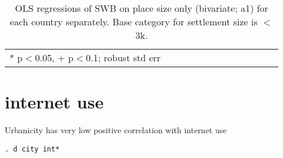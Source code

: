 \documentclass[11pt, letterpaper]{article}
\begin{document}
\begin{spacing}{1.9}
\begin{spacing}{.9} \begin{table}[H]\centering   \begin{scriptsize} \begin{tabular}{p{.5in}p{.5in}p{.5in}p{.5in}p{.5in}p{.5in}p{.5in}p{.5in}p{.5in}p{.5in}p{.5
                                                                      in}p{.5in}p{.5
                                                                      in}}\hline
                                                                      
                                                                      \hline *
                                                                      p$<$0.05,
                                                                      $+$
                                                                      p$<$0.1;
                                                                      robust std
                                                                      err \end{tabular}\end{scriptsize}\caption{\label{d1}OLS
                                                                    regressions
                                                                    of SWB on
                                                                    place size
                                                                    only
                                                                    (bivariate; a1)
                                                                    for each
                                                                    country
                                                                    separately. Base category for settlement size is $<$3k.
                                                                  }\end{table} \end{spacing}


\section{internet use}

Urbanicity has very low positive correlation with internet use

\begin{spacing}{.5}
\begin{scriptsize}
\begin{verbatim}
. d city int*


\end{verbatim}
\end{scriptsize}
\end{spacing}
\end{spacing}
\end{document}
